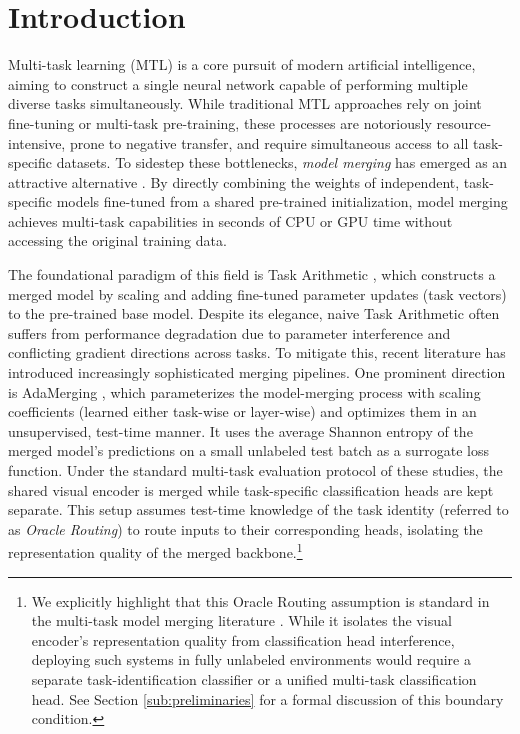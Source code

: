 \section{Introduction}
\label{submission:intro}

Multi-task learning (MTL) is a core pursuit of modern artificial intelligence, aiming to construct a single neural network capable of performing multiple diverse tasks simultaneously. While traditional MTL approaches rely on joint fine-tuning or multi-task pre-training, these processes are notoriously resource-intensive, prone to negative transfer, and require simultaneous access to all task-specific datasets. To sidestep these bottlenecks, \emph{model merging} has emerged as an attractive alternative \cite{deep_merge}. By directly combining the weights of independent, task-specific models fine-tuned from a shared pre-trained initialization, model merging achieves multi-task capabilities in seconds of CPU or GPU time without accessing the original training data.

The foundational paradigm of this field is Task Arithmetic \cite{task_arithmetic}, which constructs a merged model by scaling and adding fine-tuned parameter updates (task vectors) to the pre-trained base model. Despite its elegance, naive Task Arithmetic often suffers from performance degradation due to parameter interference and conflicting gradient directions across tasks. To mitigate this, recent literature has introduced increasingly sophisticated merging pipelines. One prominent direction is AdaMerging \cite{AdaMerging_ICLR_2024}, which parameterizes the model-merging process with scaling coefficients (learned either task-wise or layer-wise) and optimizes them in an unsupervised, test-time manner. It uses the average Shannon entropy of the merged model's predictions on a small unlabeled test batch as a surrogate loss function. Under the standard multi-task evaluation protocol of these studies, the shared visual encoder is merged while task-specific classification heads are kept separate. This setup assumes test-time knowledge of the task identity (referred to as \emph{Oracle Routing}) to route inputs to their corresponding heads, isolating the representation quality of the merged backbone.\footnote{We explicitly highlight that this Oracle Routing assumption is standard in the multi-task model merging literature \cite{task_arithmetic, AdaMerging_ICLR_2024, ties_merging}. While it isolates the visual encoder's representation quality from classification head interference, deploying such systems in fully unlabeled environments would require a separate task-identification classifier or a unified multi-task classification head. See Section \ref{sub:preliminaries} for a formal discussion of this boundary condition.}


